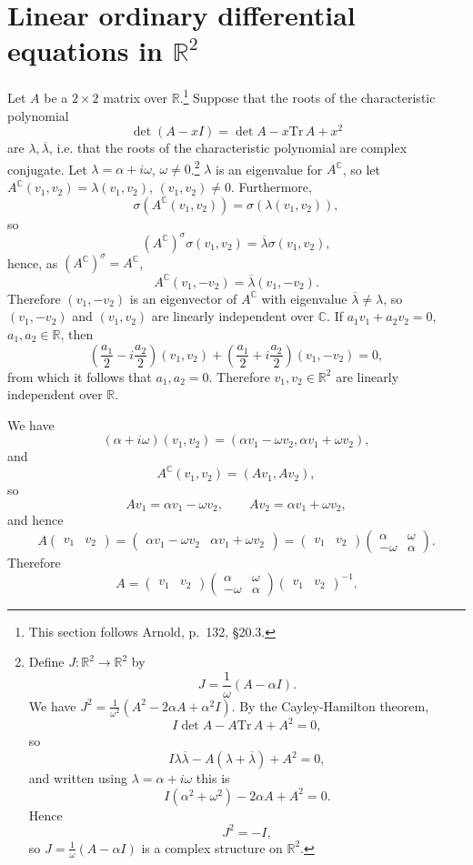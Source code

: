 \documentclass{article}
\newcommand{\Tr}{\textrm{Tr}\,}
\begin{document}
\section{Linear ordinary differential equations in $\mathbb{R}^2$}
Let $A$ be a $2 \times 2$ matrix over $\mathbb{R}$.\footnote{This section follows Arnold, p.~132, \S 20.3.} Suppose that the roots of
the characteristic polynomial
\[
\det(A-x I)=\det A-x \Tr A + x^2
\]
are $\lambda,\overline{\lambda}$, i.e. that the roots of the characteristic polynomial are
complex conjugate. Let $\lambda=\alpha+i\omega$, $\omega \neq 0$.\footnote{Define $J: \mathbb{R}^2 \to \mathbb{R}^2$ by
\[
J=\frac{1}{\omega}(A-\alpha I ).
\]
We have $J^2=\frac{1}{\omega^2}(A^2-2\alpha A+\alpha^2 I)$. By the Cayley-Hamilton theorem, 
\[
I\det A - A\Tr A + A^2=0,
\]
so
\[
I \lambda \overline{\lambda}-A(\lambda+\overline{\lambda})+A^2=0,
\]
and written using $\lambda=\alpha+i\omega$ this is
\[
I(\alpha^2+\omega^2)-2\alpha A+A^2=0.
\]
Hence
\[
J^2=-I,
\]
so $J=\frac{1}{\omega}(A-\alpha I )$ is a complex structure on $\mathbb{R}^2$.}
$\lambda$ is an eigenvalue for $A^\mathbb{C}$, so
let $A^\mathbb{C}(v_1,v_2)=\lambda(v_1,v_2)$, $(v_1,v_2) \neq 0$. 
Furthermore,
\[
\sigma(A^\mathbb{C}(v_1,v_2))=\sigma(\lambda(v_1,v_2)),
\]
so
\[
(A^\mathbb{C})^\sigma \sigma(v_1,v_2)=\overline{\lambda} \sigma(v_1,v_2),
\]
hence, as $(A^\mathbb{C})^\sigma=A^\mathbb{C}$,
\[
A^\mathbb{C}(v_1,-v_2)=\overline{\lambda} (v_1,-v_2).
\]
Therefore $(v_1,-v_2)$ is an eigenvector of $A^\mathbb{C}$ with eigenvalue $\overline{\lambda} \neq \lambda$, so
$(v_1,-v_2)$ and $(v_1,v_2)$ are linearly independent over $\mathbb{C}$. If $a_1v_1+a_2v_2=0$, $a_1,a_2 \in \mathbb{R}$, then
\[
\left(\frac{a_1}{2}-i\frac{a_2}{2}\right)(v_1,v_2)+\left(\frac{a_1}{2}+i\frac{a_2}{2}\right)(v_1,-v_2)=0,
\]
from which it follows that $a_1,a_2=0$. Therefore $v_1,v_2 \in \mathbb{R}^2$ are linearly independent over $\mathbb{R}$. 


We have
\[
(\alpha+i\omega)(v_1,v_2)=(\alpha v_1-\omega v_2,\alpha v_1+\omega v_2),
\]
and
\[
A^\mathbb{C}(v_1,v_2)=(Av_1,Av_2),
\]
so
\[
Av_1=\alpha v_1-\omega v_2, \qquad Av_2=\alpha v_1+\omega v_2,
\]
and
hence
\[
A\begin{pmatrix}v_1&v_2\end{pmatrix}=\begin{pmatrix}\alpha v_1-\omega v_2&\alpha v_1+\omega v_2\end{pmatrix}
=\begin{pmatrix}v_1&v_2\end{pmatrix}
\begin{pmatrix}\alpha&\omega \\ -\omega&\alpha\end{pmatrix}.
\]
Therefore
\[
A=\begin{pmatrix}v_1&v_2\end{pmatrix}
\begin{pmatrix}\alpha&\omega \\ -\omega&\alpha\end{pmatrix}\begin{pmatrix}v_1&v_2\end{pmatrix}^{-1}.
\]
\end{document}
